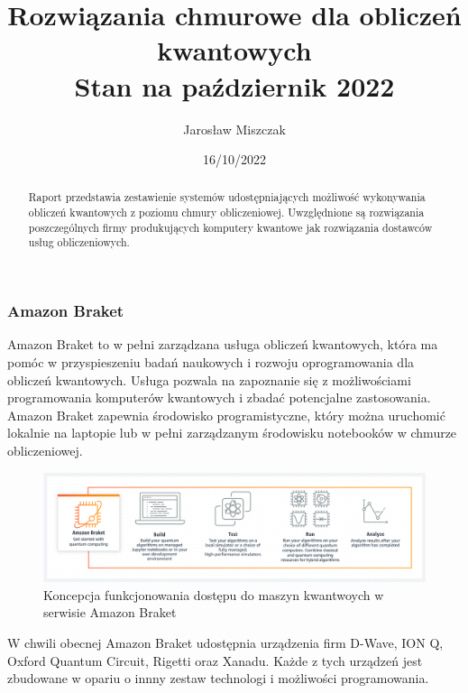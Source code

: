 \documentclass[a4paper,12pt
]{article}
\begin{document}
\title{Rozwiązania chmurowe dla obliczeń
kwantowych\\ {\normalsize Stan na październik
2022}}

\author{Jarosław Miszczak}
\date{16/10/2022}

\maketitle

\begin{abstract}
Raport przedstawia zestawienie systemów udostępniających możliwość
wykonywania obliczeń kwantowych z poziomu chmury obliczeniowej.
Uwzględnione są rozwiązania poszczególnych firmy produkujących komputery
kwantowe jak rozwiązania dostawców usług obliczeniowych.
\end{abstract}



\hypertarget{amazon-braket}{%
\subsubsection{Amazon Braket}\label{amazon-braket}}

Amazon Braket to w pełni zarządzana usługa obliczeń kwantowych, która ma
pomóc w przyspieszeniu badań naukowych i rozwoju oprogramowania dla
obliczeń kwantowych. Usługa pozwala na zapoznanie się z możliwościami
programowania komputerów kwantowych i zbadać potencjalne zastosowania.
Amazon Braket zapewnia środowisko programistyczne, który można uruchomić
lokalnie na laptopie lub w pełni zarządzanym środowisku notebooków w
chmurze obliczeniowej.

\begin{figure}
\centering
\includegraphics{amazon-braket-diagram.png}
\caption{Koncepcja funkcjonowania dostępu do maszyn kwantwoych w
serwisie Amazon Braket}
\end{figure}

W chwili obecnej Amazon Braket udostępnia urządzenia firm D-Wave, ION Q,
Oxford Quantum Circuit, Rigetti oraz Xanadu. Każde z tych urządzeń jest
zbudowane w opariu o innny zestaw technologi i możliwości programowania.
\end{document}
